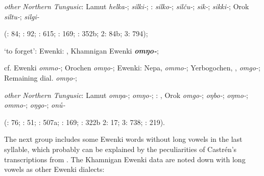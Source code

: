 \documentclass[output=paper,colorlinks,citecolor=brown]{langscibook}
\begin{document}
\begin{xlist}
\begin{xlist}
    \textit{other Northern Tungusic}: Lamut \textit{helka-};  \textit{silki-}; \textit{}:  \textit{silko-};  \textit{silču-};  \textit{sik-};  \textit{sikki-}; Orok \textit{siltu-};  \textit{silgi-}
    
    (\citealt{Castrén1856}: 84; \citealt{Janhunen1991}: 92; \citealt{Dorji1998}: 615; \citealt{Chaoke2014a}: 169; \citealt{Vasilevic1958}: 352b; \citealt{Cincius1975B} 2: 84b; \citealt{Hauer1952} 3: 794);

    \ex ‘to forget’:  Ewenki: , Khamnigan Ewenki \textbf{\textit{omŋo-}};

    cf.  Ewenki \textit{ommo-}; Orochen \textit{omŋo-};  Ewenki: Nepa,  \textit{ommo-}; Yerbogochen, ,  \textit{omgo-}; Remaining dial. \textit{omŋo-};

    \textit{other Northern Tungusic}: Lamut \textit{omŋa}-;  \textit{omŋo-}; \textit{}: , Orok \textit{omgo-};  \textit{oŋbo-};  \textit{oŋmo-};  \textit{ommo-};  \textit{oŋgo-};  \textit{onů-}
    
    (\citealt{Castrén1856}: 76; \citealt{Janhunen1991}: 51; \citealt{Dorji1998}: 507a; \citealt{Chaoke2014a}: 169; \citealt{Vasilevic1958}: 322b \citealt{Cincius1975B} 2: 17; \citealt{Hauer1952} 3: 738; \citealt{Zikmundová2013a}: 219).
\end{xlist}

\end{xlist}
\z

\ea
The next group includes some  Ewenki words without long vowels in the last syllable, which probably can be explained by the peculiarities of Castrén’s transcriptions from \citeyear{Castrén1856}. The Khamnigan Ewenki data are noted down with long vowels as other Ewenki dialects:
\end{document}
